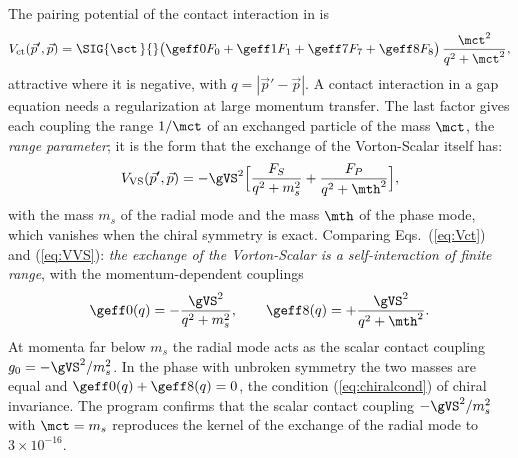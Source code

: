 The pairing potential of the contact interaction in  is
\begin{equation}
V_{\mathrm{ct}}(\vec p',\vec p)=\SIG{\sct\,}{}\big(\geff0F_0+\geff1F_1+\geff7F_7+\geff8F_8\big)\,\frac{\mct^{2}}{q^{2}+\mct^{2}},
\label{eq:Vct}
\end{equation}
attractive where it is negative, with $q=|\vec p'-\vec p|$. A contact interaction in a gap equation
needs a regularization at large momentum transfer. The last factor gives each coupling the range
$1/\mct$ of an exchanged particle of the mass $\mct$, the \emph{range parameter}; it is the form that
the exchange of the Vorton-Scalar itself has:
\begin{equation}
V_{\mathrm{VS}}(\vec p',\vec p)=-\gVS^{2}\Big[\frac{F_S}{q^{2}+m_s^{2}}+\frac{F_P}{q^{2}+\mth^{2}}\Big],
\label{eq:VVS}
\end{equation}
with the mass $m_s$ of the radial mode and the mass $\mth$ of the phase mode, which vanishes when the
chiral symmetry is exact.
Comparing Eqs.~(\ref{eq:Vct}) and (\ref{eq:VVS}): \emph{the exchange of the
Vorton-Scalar is a self-interaction of finite range}, with the momentum-dependent couplings
\begin{equation}
\geff0(q)=-\frac{\gVS^{2}}{q^{2}+m_s^{2}},\qquad\geff8(q)=+\frac{\gVS^{2}}{q^{2}+\mth^{2}} .
\label{eq:gq_exchange}
\end{equation}
At momenta far below $m_s$ the radial mode acts as the scalar contact coupling
$g_0=-\gVS^{2}/m_s^{2}$. In the phase with unbroken symmetry the two masses are equal and
$\geff0(q)+\geff8(q)=0$, the condition (\ref{eq:chiralcond}) of chiral invariance.
The program confirms
that the scalar contact coupling $-\gVS^{2}/m_s^{2}$ with $\mct=m_s$ reproduces the kernel of the
exchange of the radial mode to $3\times10^{-16}$.

